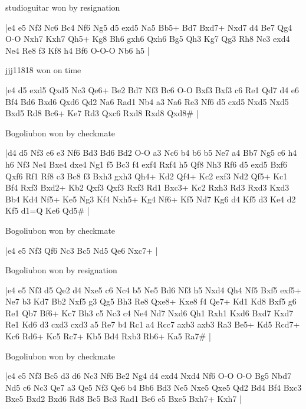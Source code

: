 \showboard

studioguitar won by resignation

\makegametitle
|e4 e5 Nf3 Nc6 Bc4 Nf6 Ng5 d5 exd5 Na5 Bb5+ Bd7 Bxd7+ Nxd7 d4 Be7 Qg4 O-O Nxh7 Kxh7 Qh5+ Kg8 Bh6 gxh6 Qxh6 Bg5 Qh3 Kg7 Qg3 Rh8 Nc3 exd4 Ne4 Re8 f3 Kf8 h4 Bf6 O-O-O Nb6 h5  |

\showboard

jjj11818 won on time

\makegametitle
|e4 d5 exd5 Qxd5 Nc3 Qe6+ Be2 Bd7 Nf3 Bc6 O-O Bxf3 Bxf3 c6 Re1 Qd7 d4 e6 Bf4 Bd6 Bxd6 Qxd6 Qd2 Na6 Rad1 Nb4 a3 Na6 Re3 Nf6 d5 cxd5 Nxd5 Nxd5 Bxd5 Rd8 Bc6+ Ke7 Rd3 Qxc6 Rxd8 Rxd8 Qxd8\#  |

\showboard

Bogoliubon won by checkmate

\makegametitle
|d4 d5 Nf3 e6 e3 Nf6 Bd3 Bd6 Bd2 O-O a3 Nc6 b4 b6 b5 Ne7 a4 Bb7 Ng5 c6 h4 h6 Nf3 Ne4 Bxe4 dxe4 Ng1 f5 Bc3 f4 exf4 Rxf4 h5 Qf8 Nh3 Rf6 d5 exd5 Bxf6 Qxf6 Rf1 Rf8 c3 Bc8 f3 Bxh3 gxh3 Qh4+ Kd2 Qf4+ Kc2 exf3 Nd2 Qf5+ Kc1 Bf4 Rxf3 Bxd2+ Kb2 Qxf3 Qxf3 Rxf3 Rd1 Bxc3+ Kc2 Rxh3 Rd3 Rxd3 Kxd3 Bb4 Kd4 Nf5+ Ke5 Ng3 Kf4 Nxh5+ Kg4 Nf6+ Kf5 Nd7 Kg6 d4 Kf5 d3 Ke4 d2 Kf5 d1=Q Ke6 Qd5\#  |

\showboard

Bogoliubon won by checkmate

\makegametitle
|e4 e5 Nf3 Qf6 Nc3 Bc5 Nd5 Qe6 Nxc7+  |

\showboard

Bogoliubon won by resignation

\makegametitle
|e4 e5 Nf3 d5 Qe2 d4 Nxe5 c6 Nc4 b5 Ne5 Bd6 Nf3 h5 Nxd4 Qh4 Nf5 Bxf5 exf5+ Ne7 b3 Kd7 Bb2 Nxf5 g3 Qg5 Bh3 Re8 Qxe8+ Kxe8 f4 Qe7+ Kd1 Kd8 Bxf5 g6 Re1 Qb7 Bf6+ Kc7 Bh3 c5 Nc3 c4 Ne4 Nd7 Nxd6 Qh1 Rxh1 Kxd6 Bxd7 Kxd7 Re1 Kd6 d3 cxd3 cxd3 a5 Re7 b4 Rc1 a4 Rcc7 axb3 axb3 Ra3 Be5+ Kd5 Rcd7+ Kc6 Rd6+ Kc5 Rc7+ Kb5 Bd4 Rxb3 Rb6+ Ka5 Ra7\#  |

\showboard

Bogoliubon won by checkmate

\makegametitle
|e4 e5 Nf3 Bc5 d3 d6 Nc3 Nf6 Be2 Ng4 d4 exd4 Nxd4 Nf6 O-O O-O Bg5 Nbd7 Nd5 c6 Nc3 Qe7 a3 Qe5 Nf3 Qe6 b4 Bb6 Bd3 Ne5 Nxe5 Qxe5 Qd2 Bd4 Bf4 Bxc3 Bxe5 Bxd2 Bxd6 Rd8 Bc5 Bc3 Rad1 Be6 e5 Bxe5 Bxh7+ Kxh7  |

